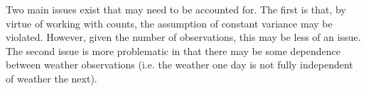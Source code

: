 \documentclass[12pt,letterpaper,article]{memoir} %
\begin{document}
Two main issues exist that may need to be accounted for. The first is that, by virtue of working with counts, the assumption of constant variance may be violated. However, given the number of observations, this may be less of an issue. The second issue is more problematic in that there may be some dependence between weather observations (i.e. the weather one day is not fully independent of weather the next).



\printbibliography
\end{document}
